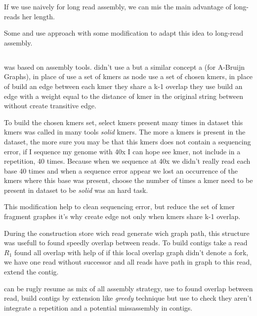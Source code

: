 \documentclass[main]{subfiles}
\begin{document}
If we use \DBG naively for long read assembly, we can mis the main advantage of long-reads her length.

Some \flye and \wtdbg use \DBG approach with some modification to adapt this idea to long-read assembly.

\subsection{\flye}

\flye\cite{Flye} was based on \abruijn\cite{abruijn} assembly tools. \abruijn didn't use a \DBG but a similar concept a  (for A-Bruijn Graphs), in place of use a set of kmers as node  use a set of chosen kmers, in place of build an edge between each kmer they share a k-1 overlap they use  build an edge with a weight equal to the distance of kmer in the original string between without create transitive edge.

To build the chosen kmers set, \abruijn select kmers present many times in dataset this kmers was called in many tools \textit{solid} kmers. The more a kmers is present in the dataset, the more sure you may be that this kmers does not contain a sequencing error, if I sequence my genome with 40x I can hope see kmer, not include in a repetition, 40 times. Because when we sequence at 40x we didn't really read each base 40 times and when a sequence error appear we lost an occurrence of the kmers where this base was present, choose the number of times a kmer need to be present in dataset to be \textit{solid} was an hard task.

This modification help to clean sequencing error, but reduce the set of kmer fragment \DBG graphes it's why  create edge not only when kmers share k-1 overlap. 

During the  construction \abruijn store wich read generate wich graph path, this structure was usefull to found speedly overlap between reads. To build contigs \abruijn take a read $R_1$ found all overlap with help of  if this local overlap graph didn't denote a fork, we have one read without successor and all reads have path in graph to this read, \abruijn extend the contig.

\abruijn can be rugly resume as mix of all assembly strategy, use \DBG to found overlap between read, build contigs by extension like \textit{greedy} technique but use \OLC to check they aren't integrate a repetition and a potential missassembly in contigs.
\end{document}
